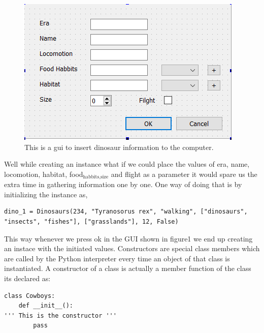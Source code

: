 \documentclass[11pt]{article}
\begin{document}
\begin{figure}[htbp]
\centering
\includegraphics[width=.9\linewidth]{./img/dino_gui.png}
\caption{\label{fig:orgc483fc9}
This is a gui to insert dinosaur information to the computer.}
\end{figure}

Well while creating an instance what if we could place the values of era, name, locomotion, habitat, food\(_{\text{habbits,size}}\) and flight as a parameter it would spare us the extra time in gathering information one by one. One way of doing that is by initializing the instance as,

\begin{verbatim}
dino_1 = Dinosaurs(234, "Tyranosorus rex", "walking", ["dinosaurs", "insects", "fishes"], ["grasslands"], 12, False) 
\end{verbatim}

This way whenever we press ok in the GUI shown in figure1 we end up creating an instace with the initiated values. Constructors are special class members which are called by the Python interpreter every time an object of that class is instantiated. A constructor of a class is actually a member function of the class its declared as: 
\begin{verbatim}
class Cowboys:
    def __init__():
''' This is the constructor '''
        pass
\end{verbatim}
\end{document}
